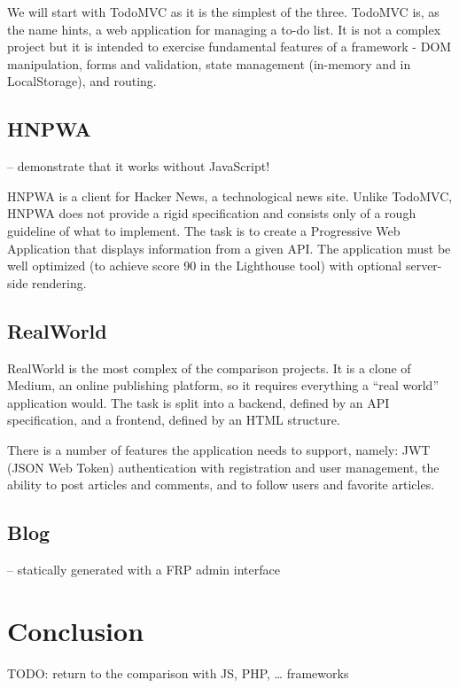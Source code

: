 \documentclass[english,odsaz]{fitthesis}
\begin{document}
We will start with TodoMVC as it is the simplest of the three. TodoMVC is, as
the name hints, a web application for managing a to-do list. It is not a complex
project but it is intended to exercise fundamental features of a framework - DOM
manipulation, forms and validation, state management (in-memory and in
LocalStorage), and routing.

\section{HNPWA}
\label{sec:org7662cf7}
-- demonstrate that it works without JavaScript!

HNPWA \cite{hnpwa} is a client for Hacker News, a technological news site. Unlike TodoMVC,
HNPWA does not provide a rigid specification and consists only of a rough
guideline of what to implement. The task is to create a Progressive Web
Application that displays information from a given API. The application must be
well optimized (to achieve score 90 in the Lighthouse tool) with optional
server-side rendering.

\section{RealWorld}
\label{sec:org89ab794}
RealWorld \cite{realworld} is the most complex of the comparison projects. It is a clone of
Medium, an online publishing platform, so it requires everything a ``real world''
application would. The task is split into a backend, defined by an API
specification, and a frontend, defined by an HTML structure.

There is a number of features the application needs to support, namely: JWT
(JSON Web Token) authentication with registration and user management, the
ability to post articles and comments, and to follow users and favorite articles.

\section{Blog}
\label{sec:org39dd976}
-- statically generated with a FRP admin interface

\chapter{Conclusion}
\label{sec:orga2dc283}
TODO: return to the comparison with JS, PHP, \ldots{} frameworks
\end{document}
